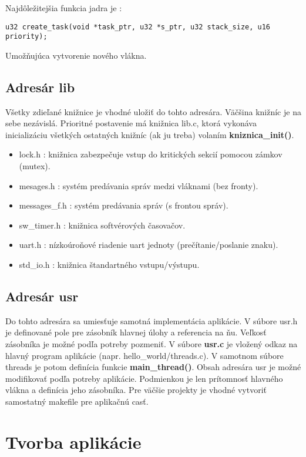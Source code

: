 Najdôležitejšia funkcia jadra je :
{\small
\begin{verbatim}
u32 create_task(void *task_ptr, u32 *s_ptr, u32 stack_size, u16 priority);
\end{verbatim}
}

Umožňujúca vytvorenie nového vlákna.

\subsection{Adresár lib}

Všetky zdieľané knižnice je vhodné uložiť do tohto adresára. Väčšina knižníc je na sebe nezávislá. Prioritné postavenie má knižnica lib.c, ktorá vykonáva inicializáciu všetkých ostatných knižníc (ak ju treba) volaním \textbf{kniznica\_init()}. 

\begin{itemize}
	\item lock.h : knižnica zabezpečuje vstup do kritických sekcií pomocou zámkov (mutex).
	\item mesages.h : systém predávania správ medzi vláknami (bez fronty).
	\item messages\_f.h : systém predávania správ (s frontou správ).
	\item sw\_timer.h : knižnica softvérových časovačov.
	\item uart.h : nízkoúroňové riadenie uart jednoty (prečítanie/poslanie znaku).
	\item std\_io.h : knižnica štandartného vstupu/výstupu.
\end{itemize}

\subsection{Adresár usr}

Do tohto adresára sa umiesťuje samotná implementácia aplikácie. V súbore usr.h je definované pole pre zásobník hlavnej úlohy a referencia na ňu. Veľkosť zásobníka je možné podľa potreby pozmeniť. V súbore \textbf{usr.c} je vložený odkaz na hlavný program aplikácie (napr. hello\_world/threads.c). V samotnom súbore threads je potom definícia funkcie \textbf{main\_thread()}. 
Obsah adresára usr je možné modifikovať podľa potreby aplikácie. Podmienkou je len prítomnosť hlavného vlákna a definícia jeho zásobníka. Pre väčšie projekty je vhodné vytvoriť samostatný makefile pre aplikačnú casť.

\section{Tvorba aplikácie}

